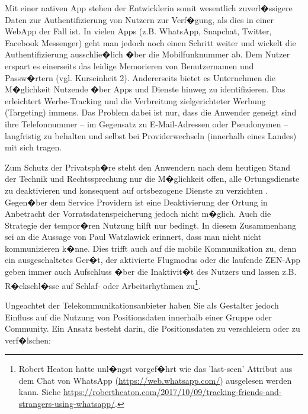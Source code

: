 Mit einer nativen App stehen der Entwicklerin somit wesentlich zuverl�ssigere Daten zur Authentifizierung von Nutzern zur Verf�gung, als dies in einer WebApp der Fall ist. In vielen Apps (z.B. WhatsApp, Snapchat, Twitter, Facebook Messenger) geht man jedoch noch einen Schritt weiter und wickelt die Authentifizierung ausschlie�lich �ber die Mobilfunknummer ab. Dem Nutzer erspart es einerseits das leidige Memorieren von Benutzernamen und Passw�rtern (vgl. Kurseinheit 2). Andererseits bietet es Unternehmen die M�glichkeit Nutzende �ber Apps und Dienste hinweg zu identifizieren. Das erleichtert Werbe-Tracking und die Verbreitung zielgerichteter Werbung (Targeting) immens. Das Problem dabei ist nur, dass die Anwender geneigt sind ihre Telefonnummer -- im Gegensatz zu E-Mail-Adressen oder Pseudonymen -- langfristig zu behalten und selbst bei Providerwechseln (innerhalb eines Landes) mit sich tragen.        


   
Zum Schutz der Privatsph�re steht den Anwendern nach dem heutigen Stand der Technik und Rechtssprechung nur die M�glichkeit offen, alle Ortungsdienste zu deaktivieren und konsequent auf ortsbezogene Dienste zu verzichten \cite{Dhein2017}. Gegen�ber dem Service Providern ist eine Deaktivierung der Ortung in Anbetracht der Vorratsdatenspeicherung jedoch nicht m�glich. Auch die Strategie der tempor�ren Nutzung hilft nur bedingt. In diesem Zusammenhang sei an die Aussage von Paul Watzlawick erinnert, dass man nicht nicht kommunizieren k�nne. Dies trifft auch auf die mobile Kommunikation zu, denn ein ausgeschaltetes Ger�t, der aktivierte Flugmodus oder die laufende ZEN-App geben immer auch Aufschluss �ber die Inaktivit�t des Nutzers und lassen z.B. R�ckschl�sse auf Schlaf- oder Arbeitsrhythmen zu\footnote{Robert Heaton hatte unl�ngst vorgef�hrt wie das 'last-seen' Attribut aus dem Chat von WhatsApp (\url{https://web.whatsapp.com/}) ausgelesen werden kann. Siehe \url{https://robertheaton.com/2017/10/09/tracking-friends-and-strangers-using-whatsapp/}.}. 

Ungeachtet der Telekommunikationsanbieter haben Sie als Gestalter jedoch Einfluss auf die Nutzung von Positionsdaten innerhalb einer Gruppe oder Community. Ein Ansatz besteht darin, die Positionsdaten zu  verschleiern oder zu verf�lschen: 

